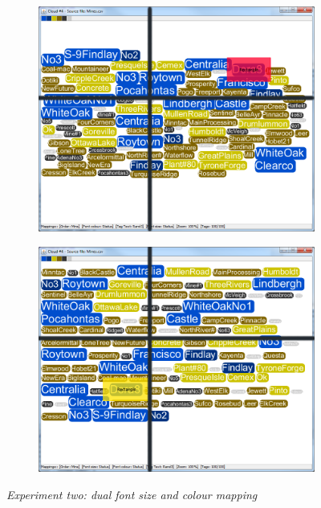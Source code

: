 \begin{figure}[!htb]
\begin{subfigure}{.5\textwidth}
  \includegraphics[scale=0.25]{Experiment2/T4/M3Spiral.png}
\end{subfigure}%
\begin{subfigure}{.5\textwidth}
  \centering
 \includegraphics[scale=0.25]{Experiment2/T4/M3Typewriter.png}
\end{subfigure}
\caption{\textit{Experiment two: dual font size and colour mapping}}
\end{figure}





